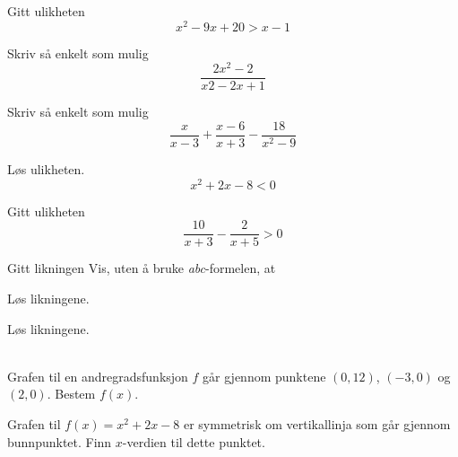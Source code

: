 Gitt ulikheten 
\[ x^2-9x+20>x-1 \]

Skriv så enkelt som mulig
\[ \frac{2x^2-2}{x2-2x +1} \]

Skriv så enkelt som mulig
\[ \frac{x}{x-3}+\frac{x-6}{x+3}-\frac{18}{x^2-9} \]

Løs ulikheten.
\[ x^2+2x-8 < 0 \]

\newpage
{}
Gitt ulikheten
\[ \frac{10}{x+3}-\frac{2}{x+5}>0 \]

\nes
{} 
Gitt likningen
Vis, uten å bruke \textit{abc}-formelen, at

Løs likningene.\os
{}\\[12pt]

Løs likningene.\os
{}
\\[12pt]
\\[12pt]

Grafen til en andregradsfunksjon $ f $ går gjennom punktene $ (0, 12) $, $ (-3, 0) $ og $ (2, 0) $. Bestem $ f(x) $.

\newpage
{}
Grafen til $ {f(x)=x^2+2x-8} $ er symmetrisk om vertikallinja som går gjennom bunnpunktet. Finn $ x $-verdien til dette punktet.


